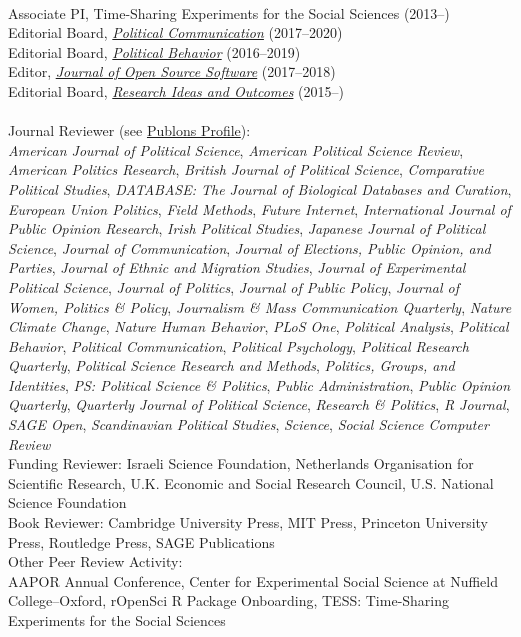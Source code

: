 \documentclass[12pt]{article}
\renewcommand{\section}[1]{\pagebreak[3]%
    \llap{\scshape\smash{\parbox[t]{\marginparwidth}{\raggedright {\color{lg}#1}}}}%
    \vspace{-\baselineskip}\par}
\newcommand{\topic}[1]{\pagebreak[3]\indent {\color{lg}{\footnotesize #1 }}\\}
\newcommand{\entry}[1]{\indent {\color{lg}\guillemotright}\hspace{2pt}#1\vspace{.25em}\\}
\begin{document}
\section{Editing \&\\ Reviewing}
\topic{Editing}
	\entry{Associate PI, Time-Sharing Experiments for the Social Sciences (2013--)}
	\entry{Editorial Board, \href{http://www.tandfonline.com/toc/upcp20/current}{\textit{Political Communication}} (2017--2020)}
    \entry{Editorial Board, \href{http://link.springer.com/journal/11109}{\textit{Political Behavior}} (2016--2019)}
	\entry{Editor, \href{http://joss.theoj.org/}{\textit{Journal of Open Source Software}} (2017--2018)}
	\entry{Editorial Board, \href{http://riojournal.com/}{\textit{Research Ideas and Outcomes}} (2015--)}

\topic{Peer Review Activity}
	\entry{Journal Reviewer (see \href{https://publons.com/a/634082/}{Publons Profile}):\\\textit{American Journal of Political Science}, \textit{American Political Science Review}, \textit{American Politics Research}, \textit{British Journal of Political Science}, \textit{Comparative Political Studies}, \textit{DATABASE: The Journal of Biological Databases and Curation}, \textit{European Union Politics}, \textit{Field Methods}, \textit{Future Internet}, \textit{International Journal of Public Opinion Research}, \textit{Irish Political Studies}, \textit{Japanese Journal of Political Science}, \textit{Journal of Communication}, \textit{Journal of Elections, Public Opinion, and Parties}, \textit{Journal of Ethnic and Migration Studies}, \textit{Journal of Experimental Political Science}, \textit{Journal of Politics}, \textit{Journal of Public Policy}, \textit{Journal of Women, Politics \& Policy}, \textit{Journalism \& Mass Communication Quarterly}, \textit{Nature Climate Change}, \textit{Nature Human Behavior}, \textit{PLoS One}, \textit{Political Analysis}, \textit{Political Behavior}, \textit{Political Communication}, \textit{Political Psychology}, \textit{Political Research Quarterly}, \textit{Political Science Research and Methods}, \textit{Politics, Groups, and Identities}, \textit{PS: Political Science \& Politics}, \textit{Public Administration}, \textit{Public Opinion Quarterly}, \textit{Quarterly Journal of Political Science}, \textit{Research \& Politics}, \textit{R Journal}, \textit{SAGE Open}, \textit{Scandinavian Political Studies}, \textit{Science}, \textit{Social Science Computer Review}}
	\entry{Funding Reviewer: Israeli Science Foundation, Netherlands Organisation for Scientific Research, U.K. Economic and Social Research Council, U.S. National Science Foundation}
	\entry{Book Reviewer: Cambridge University Press, MIT Press, Princeton University Press, Routledge Press, SAGE Publications}
	\entry{Other Peer Review Activity:\\ AAPOR Annual Conference, Center for Experimental Social Science at Nuffield College--Oxford, rOpenSci R Package Onboarding, TESS: Time-Sharing Experiments for the Social Sciences}
\end{document}
